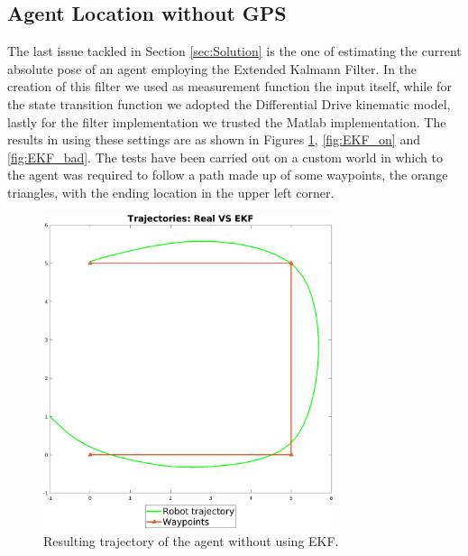 \documentclass[twocolumn, a4paper]{article}
\begin{document}
\subsection{Agent Location without GPS}
The last issue tackled in Section \ref{sec:Solution} is the one of estimating
the current absolute pose of an agent employing the Extended Kalmann Filter.
In the creation of this filter we used as measurement function the input
itself, while for the state transition function we adopted the Differential
Drive kinematic model, lastly for the filter implementation we trusted the
Matlab implementation. The results in using these settings are as shown
in Figures \ref{fig:EKF_off}, \ref{fig:EKF_on} and \ref{fig:EKF_bad}.
The tests have been carried out on a custom world in which to the agent was
required to follow a path made up of some waypoints, the orange triangles, with
the ending location in the upper left corner.
\vspace{0.5cm}
\begin{figure}[h!]
    \centering
    \includegraphics[width=8.5cm]{"../Report_images/Trajectory_no_EKF.png"}
    \caption{Resulting trajectory of the agent without using EKF.}
    \label{fig:EKF_off}
\end{figure}
\newpage
\end{document}
